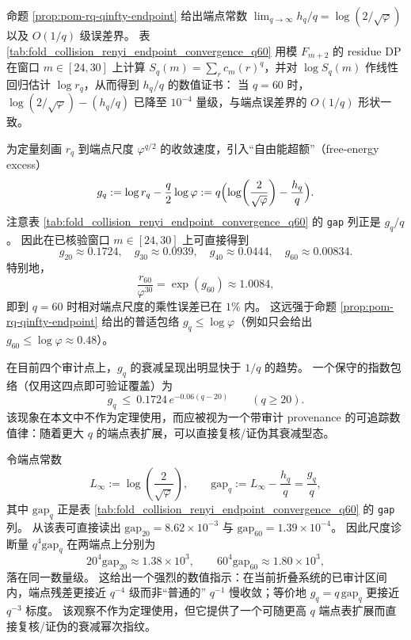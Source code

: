 \begin{remark}[端点收敛速度（可复核）：\texorpdfstring{$q\le 60$}{q<=60} 时 \texorpdfstring{$h_q/q\to\log(2/\sqrt{\varphi})$}{hq/q->log(2/sqrt(phi))}]\label{rem:pom-renyi-endpoint-q60}
命题 \ref{prop:pom-rq-qinfty-endpoint} 给出端点常数
\(
\lim_{q\to\infty}h_q/q=\log(2/\sqrt{\varphi})
\)
以及 \(O(1/q)\) 级误差界。
表 \ref{tab:fold_collision_renyi_endpoint_convergence_q60} 用模 \(F_{m+2}\) 的 residue DP 在窗口 \(m\in[24,30]\) 上计算 \(S_q(m)=\sum_r c_m(r)^q\)，并对 \(\log S_q(m)\) 作线性回归估计 \(\log r_q\)，从而得到 \(h_q/q\) 的数值证书：
当 \(q=60\) 时，\(\log(2/\sqrt{\varphi})-(h_q/q)\) 已降至 \(10^{-4}\) 量级，与端点误差界的 \(O(1/q)\) 形状一致。
\end{remark}


\begin{remark}\label{rem:pom-free-energy-excess-gq}
为定量刻画 \(r_q\) 到端点尺度 \(\varphi^{q/2}\) 的收敛速度，引入“自由能超额”（free-energy excess）
\[
g_q:=\log r_q-\frac{q}{2}\log\varphi
:= q\Bigl(\log\!\left(\frac{2}{\sqrt{\varphi}}\right)-\frac{h_q}{q}\Bigr).
\]
注意表 \ref{tab:fold_collision_renyi_endpoint_convergence_q60} 的 \texttt{gap} 列正是 \(g_q/q\)。
因此在已核验窗口 \(m\in[24,30]\) 上可直接得到
\[
g_{20}\approx 0.1724,\quad g_{30}\approx 0.0939,\quad g_{40}\approx 0.0444,\quad g_{60}\approx 0.00834.
\]
特别地，
\[
\frac{r_{60}}{\varphi^{30}}=\exp(g_{60})\approx 1.0084,
\]
即到 \(q=60\) 时相对端点尺度的乘性误差已在 \(1\%\) 内。
这远强于命题 \ref{prop:pom-rq-qinfty-endpoint} 给出的普适包络 \(g_q\le \log\varphi\)（例如只会给出 \(g_{60}\le\log\varphi\approx 0.48\)）。
\par
在目前四个审计点上，\(g_q\) 的衰减呈现出明显快于 \(1/q\) 的趋势。
一个保守的指数包络（仅用这四点即可验证覆盖）为
\[
g_q\ \le\ 0.1724\,e^{-0.06(q-20)}\qquad(q\ge 20).
\]
该现象在本文中不作为定理使用，而应被视为一个带审计 provenance 的可追踪数值律：随着更大 \(q\) 的端点表扩展，可以直接复核/证伪其衰减型态。
\end{remark}



\begin{remark}\label{rem:pom-endpoint-gap-qminus4}
令端点常数
\[
L_\infty:=\log\!\left(\frac{2}{\sqrt{\varphi}}\right),
\qquad
\mathrm{gap}_q:=L_\infty-\frac{h_q}{q}=\frac{g_q}{q},
\]
其中 \(\mathrm{gap}_q\) 正是表 \ref{tab:fold_collision_renyi_endpoint_convergence_q60} 的 \texttt{gap} 列。
从该表可直接读出
\(
\mathrm{gap}_{20}=8.62\times 10^{-3}
\)
与
\(
\mathrm{gap}_{60}=1.39\times 10^{-4}
\)。
因此尺度诊断量
\(
q^4\mathrm{gap}_q
\)
在两端点上分别为
\[
20^4\mathrm{gap}_{20}\approx 1.38\times 10^3,
\qquad
60^4\mathrm{gap}_{60}\approx 1.80\times 10^3,
\]
落在同一数量级。
这给出一个强烈的数值指示：在当前折叠系统的已审计区间内，端点残差更接近 \(q^{-4}\) 级而非“普通的” \(q^{-1}\) 慢收敛；等价地 \(g_q=q\,\mathrm{gap}_q\) 更接近 \(q^{-3}\) 标度。
该观察不作为定理使用，但它提供了一个可随更高 \(q\) 端点表扩展而直接复核/证伪的衰减幂次指纹。
\end{remark}

